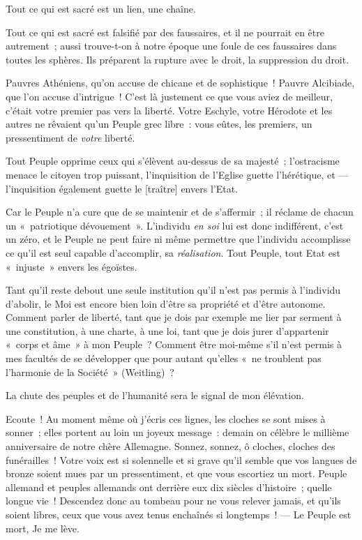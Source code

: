 \documentclass[french,twoside]{book} %
\newcommand\corr[1]{#1}
\begin{document}
Tout ce qui est sacré est un lien, une chaîne.\par
Tout ce qui est sacré est falsifié par des faussaires,  et il ne pourrait en être autrement ; aussi trouve-t-on à notre époque une foule de ces faussaires dans toutes les sphères. Ils préparent la rupture avec le droit, la suppression du droit.\par
Pauvres Athéniens, qu’on accuse de chicane et de sophistique ! Pauvre Alcibiade, que l’on accuse d’intrigue ! C’est là justement ce que vous aviez de meilleur, c’était votre premier pas vers la liberté. Votre Eschyle, votre Hérodote et les autres ne rêvaient qu’un Peuple grec libre : vous eûtes, les premiers, un pressentiment de \emph{votre} liberté.\par
Tout Peuple opprime ceux qui s’élèvent au-dessus de sa majesté ; l’ostracisme menace le citoyen trop puissant, l’inquisition de l’Eglise guette l’hérétique, et — l’inquisition également guette le [{\corr traître}] envers l’Etat.\par
Car le Peuple n’a cure que de se maintenir et de s’affermir ; il réclame de chacun un « patriotique dévouement ». L’individu \emph{en soi} lui est donc indifférent, c’est un zéro, et le Peuple ne peut faire ni même permettre que l’individu accomplisse ce qu’il est seul capable d’accomplir, sa \emph{réalisation}. Tout Peuple, tout Etat est « injuste » envers les égoïstes.\par
Tant qu’il reste debout une seule institution qu’il n’est pas permis à l’individu d’abolir, le Moi est encore bien loin d’être sa propriété et d’être autonome. Comment parler de liberté, tant que je dois par exemple me lier par serment à une constitution, à une charte, à une loi, tant que je dois jurer d’appartenir « corps et âme » à mon Peuple ? Comment être moi-même s’il n’est permis à mes facultés de se développer que pour autant qu’elles « ne troublent pas l’harmonie de la Société » (Weitling) ?\par
La chute des peuples et de l’humanité sera le signal de mon élévation.\par
Ecoute ! Au moment même où j’écris ces lignes, les cloches se sont mises à sonner ; elles portent au loin un joyeux message : demain on célèbre le millième  anniversaire de notre chère Allemagne. Sonnez, sonnez, ô cloches, cloches des funérailles ! Votre voix est si solennelle et si grave qu’il semble que vos langues de bronze soient mues par un pressentiment, et que vous escortiez un mort. Peuple allemand et peuples allemands ont derrière eux dix siècles d’histoire ; quelle longue vie ! Descendez donc au tombeau pour ne vous relever jamais, et qu’ils soient libres, ceux que vous avez tenus enchaînés si longtemps ! — Le Peuple est mort, Je me lève.\par
\end{document}

